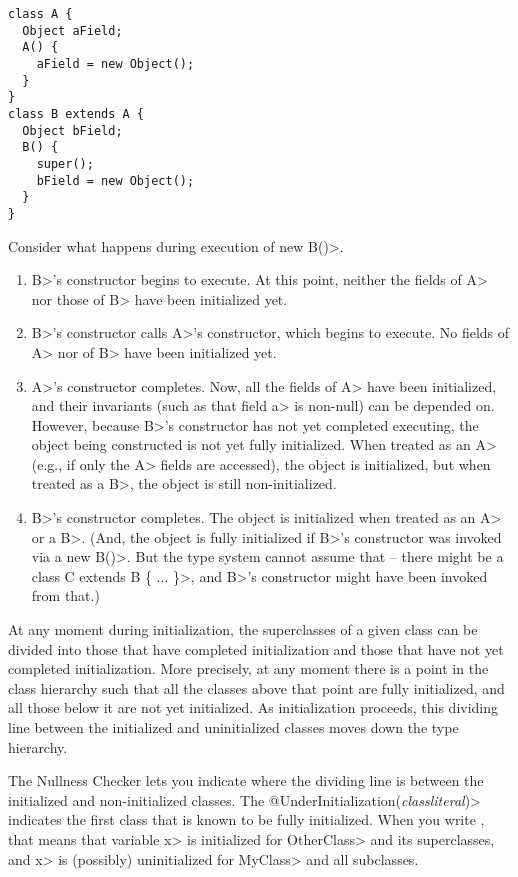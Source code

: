 \begin{Verbatim}
class A {
  Object aField;
  A() {
    aField = new Object();
  }
}
class B extends A {
  Object bField;
  B() {
    super();
    bField = new Object();
  }
}
\end{Verbatim}

Consider what happens during execution of \<new B()>.

\begin{enumerate}
\item \<B>'s constructor begins to execute.  At this point, neither the
  fields of \<A> nor those of \<B> have been initialized yet.
\item \<B>'s constructor calls \<A>'s constructor, which begins to execute.
  No fields of \<A> nor of \<B> have been initialized yet.
\item \<A>'s constructor completes.  Now, all the fields of \<A> have been
  initialized, and their invariants (such as that field \<a> is non-null) can be
  depended on.  However, because \<B>'s constructor has not yet completed
  executing, the object being constructed is not yet fully initialized.
  When treated as an \<A> (e.g., if only the \<A> fields are accessed), the
  object is initialized, but when treated as a \<B>, the object
  is still non-initialized.
\item \<B>'s constructor completes.  The object is initialized when treated
  as an \<A> or a \<B>.  (And, the object is fully initialized
   if \<B>'s constructor was invoked via a \<new B()>.  But the type system
   cannot assume that -- there might be a \<class C extends B \{
  ... \}>, and \<B>'s constructor might have been invoked from that.)
\end{enumerate}

At any moment during initialization, the superclasses of a given class
can be divided into those that have completed initialization and those that
have not yet completed initialization.  More precisely, at any moment there
is a point in the class hierarchy such that all the classes above that
point are fully initialized, and all those below it are not yet
initialized.  As initialization proceeds, this dividing line between the
initialized and uninitialized classes moves down the type hierarchy.

The Nullness Checker lets you indicate where the dividing line is between
the initialized and non-initialized classes.
The \<@UnderInitialization(\emph{classliteral})>
indicates the first class that is known to be fully initialized.
When you write , that
means that variable \<x> is initialized for \<OtherClass> and its
superclasses, and \<x> is (possibly) uninitialized for \<MyClass> and all subclasses.

